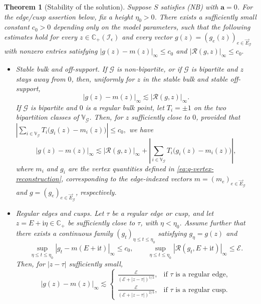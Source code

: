 \documentclass[11pt,twoside, a4paper]{article}
\numberwithin{equation}{section}
\numberwithin{figure}{section}
\theoremstyle{plain} %
\newtheorem{theorem}{Theorem}[section]
\theoremstyle{definition}
\theoremstyle{remark}
\newcommand{\1} {\mspace{1 mu}}
\newcommand{\2} {\mspace{2 mu}}
\newcommand{\Cp} {\mathbb {C}_+}
\begin{document}
\begin{theorem}[Stability of the solution]\label{lem.stability2}
Suppose $S$ satisfies (NB) with $\mathbf a=0$.
For the edge/cusp assertion below, fix a height $\eta_0>0$.
There exists a sufficiently small constant $c_0>0$
depending only on the model parameters,
such that the following estimates hold for every
$z\in\Cp(\mathcal I_\epsilon)$ and every vector
$g(z)=(g_e(z))_{e\in\vec E_{\mathcal G}}$
with nonzero entries satisfying
$
    |g(z)-m(z)|_\infty\le c_0$ and $
    |\mathcal R(g,z)|_\infty\le c_0.
$
\begin{itemize}
\item
\emph{Stable bulk and off-support.}
If $\mathcal G$ is non-bipartite, or if $\mathcal G$ is bipartite and $z$ stays
away from $0$, then, uniformly for $z$ in the stable bulk and stable
off-support, 
\begin{equation}
\label{eq:nonlinear-bulk-stability}
|g(z)-m(z)|_\infty
\lesssim
|\mathcal{R}(g,z)|_\infty.
\end{equation}
If $\mathcal G$ is bipartite and $0$ is a regular bulk point, let
$T_i=\pm1$ on the two bipartition classes of $\mathbb V_{\mathcal G}$.
Then, for $z$ sufficiently close to $0$, provided that
$
\left|
\sum_{i\in\mathbb V_{\mathcal G}}T_i
\bigl(g_i(z)-m_i(z)\bigr)
\right|
\le c_0,
$
we have
\begin{equation}
\label{eq.bulk-0-stability}
|g(z)-m(z)|_\infty
\lesssim
|\mathcal{R}(g,z)|_\infty
+
\left|
\sum_{i\in\mathbb{V}_{\mathcal G}}T_i
\bigl(g_i(z)-m_i(z)\bigr)
\right|,
\end{equation}
where $m_i$ and $g_i$ are the vertex quantities defined in
\eqref{eq:q-vertex-reconstruction}, corresponding to the edge-indexed
vectors $m=(m_e)_{e\in\vec E_{\mathcal G}}$ and
$g=(g_e)_{e\in\vec E_{\mathcal G}}$, respectively.
\item
\emph{Regular edges and cusps.}
Let $\tau$ be a regular edge or cusp, and let
$z=E+\mathrm i\eta\in\Cp$ be sufficiently close
to $\tau$, with $\eta<\eta_0$.
Assume further that there exists a continuous family
$(g_t)_{\eta\le t\le\eta_0}$ satisfying
$g_\eta=g(z)$ and
\begin{equation}\label{eq.continuity}
\sup_{\eta\le t\le\eta_0}
|g_t-m(E+\mathrm i t)|_\infty\le c_0,
\qquad
\sup_{\eta\le t\le\eta_0}
|\mathcal{R}(g_t,E+\mathrm i t)|_\infty\le\mathcal{E}.
\end{equation}
Then, for $|z-\tau|$ sufficiently small,
\begin{equation}\label{eq:nonlinear-boundary-stability}
|g(z)-m(z)|_\infty
\lesssim
\begin{cases}
\displaystyle
\frac{\mathcal{E}}
     {(\mathcal E+|z-\tau|)^{1/2}},
&
\text{if $\tau$ is a regular edge},
\\[3mm]
\displaystyle
\frac{\mathcal{E}}
     {(\mathcal{E}+|z-\tau|)^{2/3}},
&
\text{if $\tau$ is a regular cusp}.
\end{cases}
\end{equation}
\end{itemize}
\end{theorem}
\end{document}
